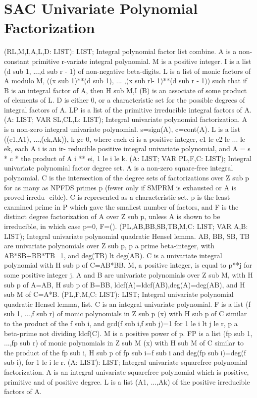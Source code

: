 \section{ SAC Univariate Polynomial Factorization  } 
 (RL,M,I,A,L,D: LIST): LIST; \eproc
\bcom Integral polynomial factor list combine. A is a non-constant
primitive r-variate integral polynomial.  M is a positive integer.
I is a list (d sub 1, ...,d sub r - 1) of non-negative beta-digits.
L is a list of monic factors of A modulo M, ((x sub 1)**(d sub 1), ...
,(x sub rl- 1)**(d sub r - 1)) such that if B is an integral factor
of A, then H sub M,I (B) is an associate of some product of elements
of L.  D is either 0, or a characteristic set for the possible degrees
of integral factors of A.  LP is a list of the primitive irreducible
integral factors of A.  \ecom 
{} (A: LIST; VAR SL,CL,L: LIST); \eproc
\bcom Integral univariate polynomial factorization. A is a non-zero
integral univariate polynomial.  s=sign(A), c=cont(A).  L is
a list ((e1,A1), ...,(ek,Ak)), k ge 0, where each ei is a
positive integer, e1 le e2 le  ... le ek, each A i is an ir-
reducible positive integral univariate polynomial, and A = s * c *
the product of A i ** ei, 1 le i le k. \ecom 
{} (A: LIST; VAR PL,F,C: LIST); \eproc
\bcom Integral univariate polynomial factor degree set. A is a non-zero
square-free integral polynomial.  C is the intersection of
the degree sets of factorizations over Z sub p for as many as NPFDS
primes p (fewer only if SMPRM is exhausted or A is proved irredu-
cible). C is represented as a characteristic set.  p is
the least examined prime in P which gave the smallest number of
factors, and F is the distinct degree factorization of A over Z sub p,
unless A is shown to be irreducible, in which case p=0, F=(). \ecom 
{} (PL,AB,BB,SB,TB,M,C: LIST; VAR A,B: LIST); \eproc
\bcom Integral univariate polynomial quadratic Hensel lemma. AB, BB, SB, TB
are univariate polynomials over Z sub p, p a prime beta-integer, with
AB*SB+BB*TB=1, and deg(TB) lt deg(AB).  C is a univariate integral
polynomial with H sub p of C=AB*BB.  M, a positive integer, is equal
to p**j for some positive integer j.  A and B are univariate
polynomials over Z sub M, with H sub p of A=AB, H sub p of B=BB,
ldcf(A)=ldcf(AB),deg(A)=deg(AB), and H sub M of C=A*B. \ecom 
{} (PL,F,M,C: LIST): LIST; \eproc
\bcom Integral univariate polynomial quadratic Hensel lemma, list. C is an
integral univariate polynomial.  F is a list (f sub 1, ...,f sub r)
of monic polynomials in Z sub p (x) with H sub p of C similar to the
product of the f sub i, and gcd(f sub i,f sub j)=1 for 1 le i
lt j le r, p a beta-prime not dividing ldcf(C).  M is a positive
power of p.  FP is a list (fp sub 1, ...,fp sub r) of monic
polynomials in Z sub M (x) with H sub M of C similar to the product of
the fp sub i, H sub p of fp sub i=f sub i and deg(fp sub
i)=deg(f sub i), for 1 le i le r. \ecom 
{} (A: LIST): LIST; \eproc
\bcom Integral univariate squarefree polynomial factorization. A is
an integral univariate squarefree polynomial which is positive,
primitive and of positive degree.  L is a list (A1, ...,Ak) of the
positive irreducible factors of A. \ecom 
